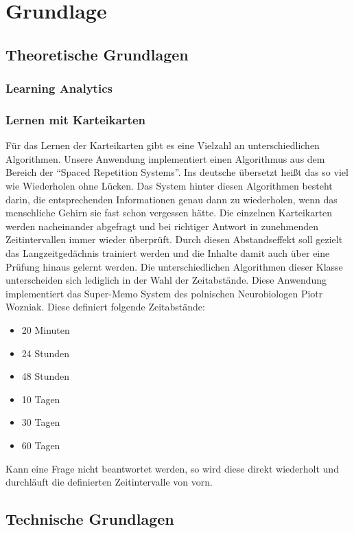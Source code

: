 \chapter{Grundlage} %
\section{Theoretische Grundlagen}
\subsection{Learning Analytics}
\subsection{Lernen mit Karteikarten}
Für das Lernen der Karteikarten gibt es eine Vielzahl an unterschiedlichen Algorithmen. Unsere Anwendung implementiert einen Algorithmus aus dem Bereich der \enquote{Spaced Repetition Systems}. Ins deutsche übersetzt heißt das so viel wie Wiederholen ohne Lücken. Das System hinter diesen Algorithmen besteht darin, die entsprechenden Informationen genau dann zu wiederholen, wenn das menschliche Gehirn sie fast schon vergessen hätte.\autocite[Vgl.][]{Tabibianet.al} Die einzelnen Karteikarten werden nacheinander abgefragt und bei richtiger Antwort in zunehmenden Zeitintervallen immer wieder überprüft. Durch diesen Abstandseffekt soll gezielt das Langzeitgedächnis trainiert werden und die Inhalte damit auch über eine Prüfung hinaus gelernt werden. Die unterschiedlichen Algorithmen dieser Klasse unterscheiden sich lediglich in der Wahl der Zeitabstände. Diese Anwendung implementiert das Super-Memo System des polnischen Neurobiologen Piotr Wozniak. Diese definiert folgende Zeitabstände:
\begin{itemize}
	\item 20 Minuten
	\item 24 Stunden
	\item 48 Stunden
	\item 10 Tagen
	\item 30 Tagen
	\item 60 Tagen
\end{itemize}  
Kann eine Frage nicht beantwortet werden, so wird diese direkt wiederholt und durchläuft die definierten Zeitintervalle von vorn. \autocite[Vgl.][]{BaileyuDavey}

\section{Technische Grundlagen}

